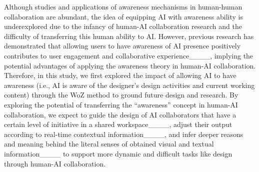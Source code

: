 Although studies and applications of awareness mechanisms in human-human collaboration are abundant, the idea of equipping AI with awareness ability is underexplored due to the infancy of human-AI collaboration research and the difficulty of transferring this human ability to AI. However, previous research has demonstrated that allowing users to have awareness of AI presence positively contributes to user engagement and collaborative experience____, implying the potential advantages of applying the awareness theory in human-AI collaboration. Therefore, in this study, we first explored the impact of allowing AI to have awareness (i.e., AI is aware of the designer's design activities and current working content) through the WoZ method to ground future design and research. By exploring the potential of transferring the ``awareness'' concept in human-AI collaboration, we expect to guide the design of AI collaborators that have a certain level of initiative in a shared workspace____, adjust their output according to real-time contextual information____, and infer deeper reasons and meaning behind the literal senses of obtained visual and textual information____ to support more dynamic and difficult tasks like design through human-AI collaboration.

